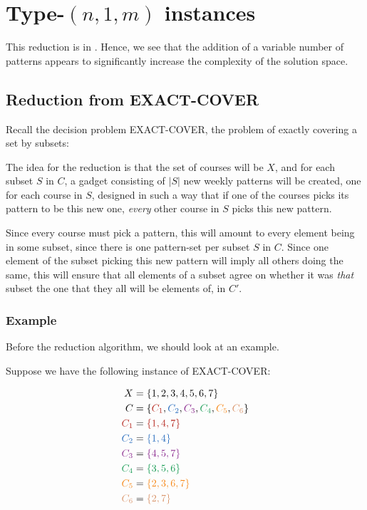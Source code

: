 \section{Type-$(n, 1, m)$ instances}

This reduction is in \nph. Hence, we see that the addition of a variable number of patterns appears to significantly increase the complexity of the solution space.

\subsection{Reduction from EXACT-COVER}
Recall the decision problem EXACT-COVER, the problem of exactly covering a set by subsets:


The idea for the reduction is that the set of courses will be $X$, and for each subset $S$ in $C$, a gadget consisting of $|S|$ new weekly patterns will be created, one for each course in $S$, designed in such a way that if one of the courses picks its pattern to be this new one, \emph{every} other course in $S$ picks this new pattern.

Since every course must pick a pattern, this will amount to every element being in some subset, since there is one pattern-set per subset $S$ in $C$. Since one element of the subset picking this new pattern will imply all others doing the same, this will ensure that all elements of a subset agree on whether it was \emph{that} subset the one that they all will be elements of, in $C'$.

\subsubsection{Example}
Before the reduction algorithm, we should look at an example.

Suppose we have the following instance of EXACT-COVER:

\begin{align*}
X &= \{1, 2, 3, 4, 5, 6, 7\}\\
C &= \{{\color{BrickRed}C_1}, {\color{NavyBlue}C_2}, {\color{Fuchsia}C_3}, {\color{ForestGreen}C_4}, {\color{BurntOrange}C_5}, {\color{Tan}C_6}\}\\
{\color{BrickRed} C_1} &= {\color{BrickRed} \{1, 4, 7\}}\\
{\color{NavyBlue} C_2} &= {\color{NavyBlue}\{ 1, 4 \} }\\
{\color{Fuchsia} C_3} &= {\color{Fuchsia} \{ 4, 5, 7\} }\\
{\color{ForestGreen} C_4} &= {\color{ForestGreen} \{ 3, 5, 6\} }\\
{\color{BurntOrange} C_5} &= {\color{BurntOrange} \{ 2, 3, 6, 7 \}}\\
{\color{Tan} C_6} &= {\color{Tan} \{2, 7\}}
\end{align*}

